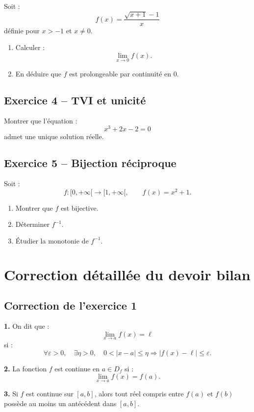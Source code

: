 \documentclass[11pt,a4paper]{article}
\newcommand{\implique}{\Longrightarrow}
\begin{document}
Soit :
\[
f(x)=\frac{\sqrt{x+1}-1}{x}
\]
définie pour \(x>-1\) et \(x\neq0\).

\begin{enumerate}
    \item Calculer :
    \[
    \lim_{x\to0}f(x).
    \]
    \item En déduire que \(f\) est prolongeable par continuité en \(0\).
\end{enumerate}

\subsection*{Exercice 4 -- TVI et unicité}

Montrer que l'équation :
\[
x^3+2x-2=0
\]
admet une unique solution réelle.

\subsection*{Exercice 5 -- Bijection réciproque}

Soit :
\[
f:[0,+\infty[\to[1,+\infty[,
\qquad
f(x)=x^2+1.
\]

\begin{enumerate}
    \item Montrer que \(f\) est bijective.
    \item Déterminer \(f^{-1}\).
    \item Étudier la monotonie de \(f^{-1}\).
\end{enumerate}

\newpage

\section{Correction détaillée du devoir bilan}

\subsection*{Correction de l'exercice 1}

\textbf{1.}  
On dit que :
\[
\lim_{x\to a}f(x)=\ell
\]
si :
\[
\forall\varepsilon>0,\quad \exists\eta>0,\quad
0<|x-a|\leq\eta\implique |f(x)-\ell|\leq\varepsilon.
\]

\textbf{2.}  
La fonction \(f\) est continue en \(a\in D_f\) si :
\[
\lim_{x\to a}f(x)=f(a).
\]

\textbf{3.}  
Si \(f\) est continue sur \([a,b]\), alors tout réel compris entre \(f(a)\) et \(f(b)\) possède au moins un antécédent dans \([a,b]\).
\end{document}
